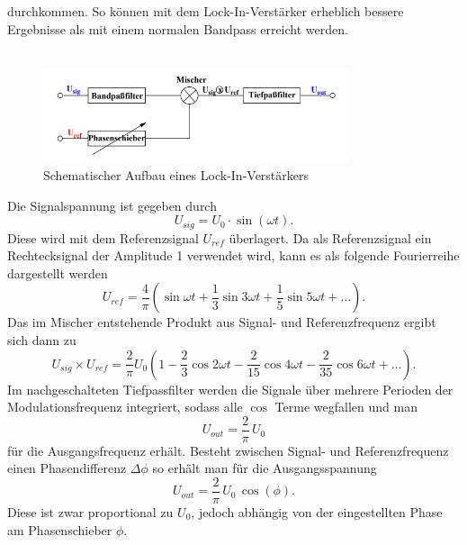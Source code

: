 durchkommen. So können mit dem Lock-In-Verstärker erheblich bessere Ergebnisse als mit einem normalen Bandpass erreicht werden.\\
\\
\begin{figure}[H]
    \centering
    \includegraphics[width=0.8\textwidth]{img/abb1.png}
    \caption{Schematischer Aufbau eines Lock-In-Verstärkers\protect\footnotemark}
    \label{fig:abb1}
\end{figure}
Die Signalspannung ist gegeben durch
\begin{equation}
    U_{sig} = U_0 \cdot \sin(\omega t).
\end{equation}
Diese wird mit dem Referenzsignal $U_{ref}$ überlagert. Da als Referenzsignal ein Rechtecksignal der Amplitude 1 verwendet wird, kann es als folgende Fourierreihe
dargestellt werden
\begin{equation}\label{eqn:referenzFrequenz}
    U_{ref} = \frac{4}{\pi}\left(\sin{ωt} + \frac{1}{3}\sin{3ωt} + \frac{1}{5}\sin{5ωt} + \ldots\right).
\end{equation}
Das im Mischer entstehende Produkt aus Signal- und Referenzfrequenz ergibt sich dann zu
\begin{equation}\label{eqn:produkt}
    U_{sig} \times U_{ref} = \frac{2}{π}U_0\left( 1 - \frac{2}{3}\cos{2ωt} - \frac{2}{15}\cos{4ωt} - \frac{2}{35}\cos{6ωt} + \ldots\right).
\end{equation}
Im nachgeschalteten Tiefpassfilter werden die Signale über mehrere Perioden der Modulationsfrequenz integriert, sodass alle $\cos$ Terme wegfallen und man
\begin{equation}\label{eqn:U0}
    U_{out} = \frac{2}{\pi}\,U_0
\end{equation}
für die Ausgangsfrequenz erhält. Besteht zwischen Signal- und Referenzfrequenz einen Phasendifferenz $\Delta \phi$ so erhält man für die Ausgangsspannung
\begin{equation}\label{U0phi}
    U_{out} = \frac{2}{\pi}\,U_0\,\cos(\phi).
\end{equation}
Diese ist zwar proportional zu $U_0$, jedoch abhängig von der eingestellten Phase am Phasenschieber $\phi$.

\newpage